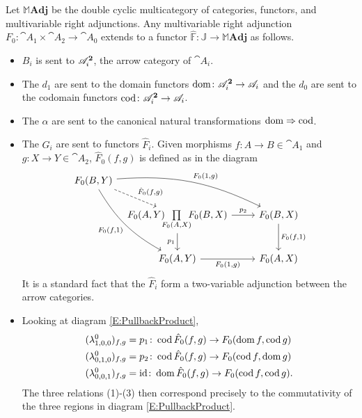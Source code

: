 \begin{example}\label{Ex:PullbackProduct}
Let $\mathbb{M}\mathbf{Adj}$ be the double cyclic multicategory of categories, functors, and multivariable right adjunctions. Any multivariable right adjunction $F_0\colon \cat{A}_1\times \cat{A}_2\to \cat{A}_0$ extends to a functor $\widehat{\mathbb{F}}\colon\mathbb{J}\to\mathbb{M}\mathbf{Adj}$ as follows.
\begin{itemize}
	\item $B_i$ is sent to $\mathscr{A}_i^{\mathbf{2}}$, the arrow category of $\cat{A}_i$.
	\item The $d_1$ are sent to the domain functors $\operatorname{dom}\colon\mathscr{A}_i^{\mathbf{2}}\to\mathscr{A}_i$ and the $d_0$ are sent to the codomain functors $\operatorname{cod}\colon\mathscr{A}_i^{\mathbf{2}}\to\mathscr{A}_i$.
	\item The $\alpha$ are sent to the canonical natural transformations $\operatorname{dom}\Rightarrow\operatorname{cod}$.
	\item The $G_i$ are sent to functors $\hat{F}_i$. Given morphisms $f\colon A\to B\in\cat{A}_1$ and $g\colon X\to Y\in\cat{A}_2$, $\hat{F}_0(f,g)$ is defined as in the diagram
	\begin{equation}\label{E:PullbackProduct}
	\begin{tikzcd}[bend angle=15]
		F_0(B,Y) \arrow[bend left]{rrd}{F_0(1,g)}
			\arrow[bend right]{rdd}[swap]{F_0(f,1)}
			\arrow[dashed]{dr}{\hat{F}_0(f,g)}
		&[-4ex]& \\
		& F_0(A,Y)\!\!\underset{F_0(A,X)}{\prod}\!\!F_0(B,X)
			\rar{p_2}
			\dar[swap]{p_1}
		& F_0(B,X) \dar{F_0(f,1)} \\
		& F_0(A,Y) \rar[swap]{F_0(1,g)} & F_0(A,X)
	\end{tikzcd}
	\end{equation}
	It is a standard fact that the $\hat{F}_i$ form a two-variable adjunction between the arrow categories. 
	\item Looking at diagram \ref{E:PullbackProduct}, 
	\begin{align*}
		(\lambda^0_{1,0,0})_{f,g}&=p_1\colon \operatorname{cod}\hat{F}_0(f,g)\to F_0(\operatorname{dom} f,\operatorname{cod} g)\\
		(\lambda^0_{0,1,0})_{f,g}&=p_2\colon \operatorname{cod}\hat{F}_0(f,g)\to F_0(\operatorname{cod} f,\operatorname{dom} g)\\
		(\lambda^0_{0,0,1})_{f,g}&=\operatorname{id}\colon \operatorname{dom}\hat{F}_0(f,g)\to F_0(\operatorname{cod} f,\operatorname{cod} g).
	\end{align*}
	The three relations (1)-(3) then correspond precisely to the commutativity of the three regions in diagram \eqref{E:PullbackProduct}.
\end{itemize}
\end{example}

